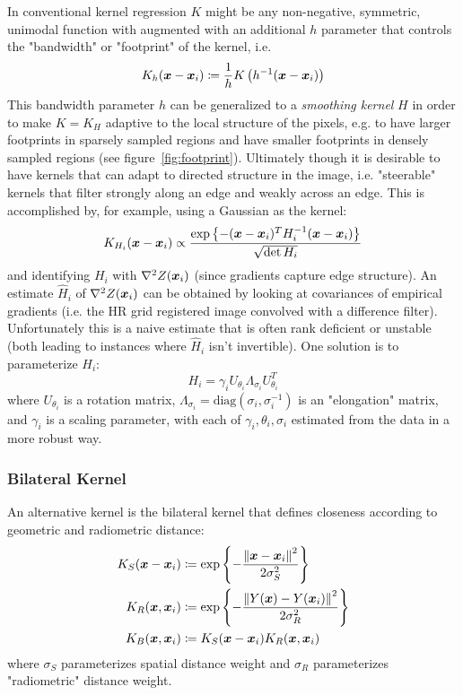 In conventional kernel regression $K$ might be any non-negative, symmetric, unimodal\cite{wand1994kernel} function with augmented with an additional $h$ parameter that controls the "bandwidth" or "footprint" of the kernel, i.e.
\begin{equation}
    K_h(\bm{x} - \bm{x}_i) \coloneqq \frac{1}{h}K\left( h^{-1}(\bm{x} - \bm{x}_i) \right)
\end{equation}
This bandwidth parameter $h$ can be generalized to a \textit{smoothing kernel} $H$ in order to make $K = K_H$ adaptive to the local structure of the pixels, e.g. to have larger footprints in sparsely sampled regions and have smaller footprints in densely sampled regions (see figure~\ref{fig:footprint}).
%
Ultimately though it is desirable to have kernels that can adapt to directed structure in the image, i.e. "steerable" kernels that filter strongly along an edge and weakly across an edge.
%
This is accomplished by, for example, using a Gaussian as the kernel:
\begin{equation}
    K_{H_i}(\bm{x} - \bm{x}_i) \propto \frac{\exp\left\{ -(\bm{x} - \bm{x}_i)^T H^{-1}_i (\bm{x} - \bm{x}_i) \right\}}{\sqrt{\det{H_i}}}
\end{equation}
and identifying $H_i$ with $\nabla^2 Z(\bm{x}_i)$ (since gradients capture edge structure).
%
An estimate $\hat{H}_i$ of $\nabla^2 Z(\bm{x}_i)$ can be obtained by looking at covariances of empirical gradients (i.e. the HR grid registered image convolved with a difference filter).
%
Unfortunately this is a naive estimate that is often rank deficient or unstable (both leading to instances where $\hat{H}_i$ isn't invertible).
%
One solution is to parameterize $H_i$:
\[
    H_i = \gamma_i U_{\theta_i} \Lambda_{\sigma_i} U_{\theta_i}^T
\]
where $U_{\theta_i}$ is a rotation matrix, $\Lambda_{\sigma_i} = \text{diag}\left( \sigma_i, \sigma_i^{-1} \right)$ is an "elongation" matrix, and $\gamma_i$ is a scaling parameter, with each of $\gamma_i, \theta_i, \sigma_i$ estimated from the data in a more robust way.
%
\subsubsection{Bilateral Kernel}
An alternative kernel is the bilateral kernel\cite{Tomasi:1998:BFG:938978.939190} that defines closeness according to geometric and radiometric distance:
\begin{equation}
    \begin{split}
        K_S(\delx) &\coloneqq \exp \left\{ -\frac{\left\| \delx \right\|^2}{2 \sigma_S^2}  \right\} \\
        K_R(\bx, \bxi) &\coloneqq \exp \left\{ -  \frac{\left\| Y(\bx) - Y(\bxi) \right\|^2}{2 \sigma_R^2} \right\} \\
        K_B(\bx, \bxi) &\coloneqq K_S(\delx)K_R(\bx, \bxi)
    \end{split}
    \label{eqn:bilateralkernel}
\end{equation}
where $\sigma_S$ parameterizes spatial distance weight and $\sigma_R$ parameterizes "radiometric" distance weight.


